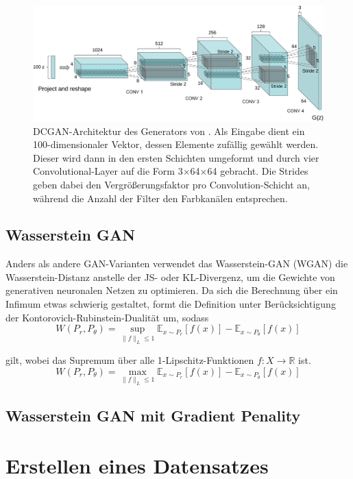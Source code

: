 \documentclass{hsflensburg}
\begin{document}
  \begin{figure}
    \includegraphics[width=\textwidth]{images/dcgan-architecture}
    \caption{DCGAN-Architektur des Generators von
    \cite{radford2016unsupervised}. Als Eingabe dient ein 100-dimensionaler
    Vektor, dessen Elemente zufällig gewählt werden. Dieser wird dann in den
    ersten Schichten umgeformt und durch vier Convolutional-Layer auf die Form
    3$\times$64$\times$64 gebracht. Die Strides geben dabei den
    Vergrößerungsfaktor pro Convolution-Schicht an, während die Anzahl der
    Filter den Farbkanälen entsprechen.}
  \end{figure}

  \section{Wasserstein GAN}
  Anders als andere GAN-Varianten verwendet das Wasserstein-GAN (WGAN) die
  Was\-ser\-stein-Distanz anstelle der JS- oder KL-Divergenz, um die Gewichte von
  generativen neuronalen Netzen zu optimieren. Da sich die Berechnung über ein
  Infimum etwas schwierig gestaltet, formt \cite{arjovsky2017wasserstein} die
  Definition unter Berücksichtigung der Kontorovich-Rubinstein-Dualität um,
  sodass
  \[
    W(P_r, P_\theta) = \sup_{\|f\|_L \leq 1} \mathbb{E}_{x \sim P_r}\left[f(x)\right] - \mathbb{E}_{x \sim P_\theta}\left[f(x)\right]
  \]

  gilt, wobei das Supremum über alle 1-Lipschitz-Funktionen $f : X \to
  \mathbb{R}$ ist.  
  \[
    W(P_r, P_\theta) = \max_{\|f\|_L \leq 1} \mathbb{E}_{x \sim P_r}\left[f(x)\right] - \mathbb{E}_{x \sim P_\theta}\left[f(x)\right]
  \]

  \section{Wasserstein GAN mit Gradient Penality}

  \chapter{Erstellen eines Datensatzes}
\end{document}
